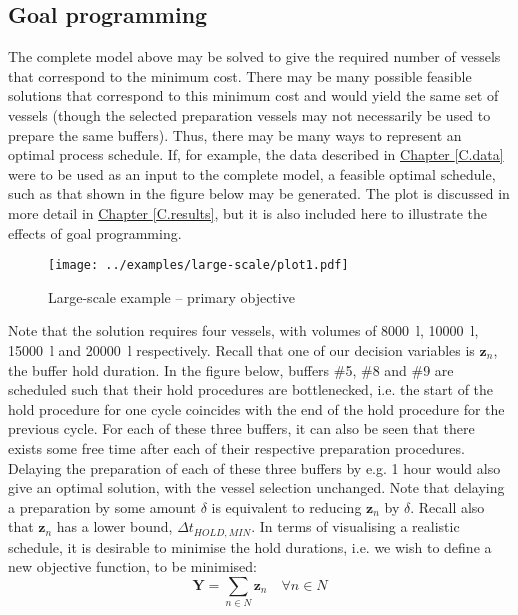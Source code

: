 \subsection{Goal programming}\label{SS.goal}
The complete model above may be solved to give the required number of vessels
that correspond to the minimum cost.
There may be many possible feasible solutions that correspond to this minimum
cost and would yield the same set of vessels (though the selected preparation
vessels may not necessarily be used to prepare the same buffers).
Thus, there may be many ways to represent an optimal process schedule.
If, for example, the data described in
\hyperref[C.data]{Chapter \ref*{C.data}} were to be used as an input to the
complete model, a feasible optimal schedule, such as that shown in the figure
below may be generated.
The plot is discussed in more detail in
\hyperref[C.results]{Chapter \ref*{C.results}}, but it is also included here to
illustrate the effects of goal programming.
\begin{figure}
    \centering
    \texttt{[image: ../examples/large-scale/plot1.pdf]}
    \caption{Large-scale example -- primary objective}
    \label{fig.primary}
\end{figure}
Note that the solution requires four vessels, with volumes of
\SI{8000}{\litre}, \SI{10000}{\litre}, \SI{15000}{\litre} and
\SI{20000}{\litre} respectively.  
Recall that one of our decision variables is $\boldsymbol{z}_{n}$, the buffer
hold duration.
In the figure below, buffers \#5, \#8 and \#9 are scheduled such that their 
hold procedures are bottlenecked, i.e. the start of the hold procedure for one
cycle coincides with the end of the hold procedure for the previous cycle.
For each of these three buffers, it can also be seen that there exists some
free time after each of their respective preparation procedures.
Delaying the preparation of each of these three buffers by e.g. 1 hour would
also give an optimal solution, with the vessel selection unchanged.
Note that delaying a preparation by some amount $\delta$ is equivalent to 
reducing $\boldsymbol{z}_{n}$ by $\delta$.
Recall also that $\boldsymbol{z}_{n}$ has a lower bound, 
$\Delta t_{\mathit{HOLD,MIN}}$.
In terms of visualising a realistic schedule, it is desirable to minimise the
hold durations, i.e. we wish to define a new objective function, to be
minimised:
\begin{equation}
    \boldsymbol{Y} = \sum_{n \in N} \boldsymbol{z}_{n} \quad \forall n \in N
    \label{eq.objfn2}
\end{equation}

